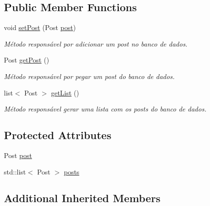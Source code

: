 \subsection*{Public Member Functions}
\begin{DoxyCompactItemize}
\item 
void \hyperlink{class_post_command_a97afc7233ef59c7443dc0b8dc646aa22}{set\-Post} (Post \hyperlink{class_post_command_a742316428e6f664b6f81334febfe3bf2}{post})
\begin{DoxyCompactList}\small\item\em Método responsável por adicionar um post no banco de dados. \end{DoxyCompactList}\item 
\hypertarget{class_post_command_a681bd3f3bcc13742174dfd3cea6211ba}{Post \hyperlink{class_post_command_a681bd3f3bcc13742174dfd3cea6211ba}{get\-Post} ()}\label{class_post_command_a681bd3f3bcc13742174dfd3cea6211ba}

\begin{DoxyCompactList}\small\item\em Método responsável por pegar um post do banco de dados. \end{DoxyCompactList}\item 
\hypertarget{class_post_command_adf6424f7cc08823acfb61a6a16094de9}{list$<$ Post $>$ \hyperlink{class_post_command_adf6424f7cc08823acfb61a6a16094de9}{get\-List} ()}\label{class_post_command_adf6424f7cc08823acfb61a6a16094de9}

\begin{DoxyCompactList}\small\item\em Método responsável gerar uma lista com os posts do banco de dados. \end{DoxyCompactList}\end{DoxyCompactItemize}
\subsection*{Protected Attributes}
\begin{DoxyCompactItemize}
\item 
Post \hyperlink{class_post_command_a742316428e6f664b6f81334febfe3bf2}{post}
\item 
std\-::list$<$ Post $>$ \hyperlink{class_post_command_ad6f46406bfc537c8cd5250fe82fc1a0a}{posts}
\end{DoxyCompactItemize}
\subsection*{Additional Inherited Members}


